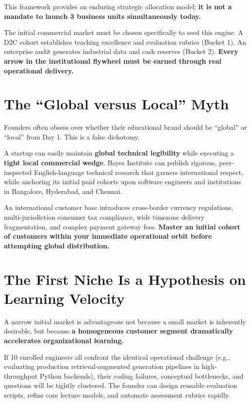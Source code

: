 This framework provides an enduring strategic allocation model; \textbf{it is not a mandate to launch 3 business units simultaneously today.}

The initial commercial market must be chosen specifically to seed this engine. A D2C cohort establishes teaching excellence and evaluation rubrics (Bucket 1). An enterprise audit generates industrial data and cash reserves (Bucket 2). \textbf{Every arrow in the institutional flywheel must be earned through real operational delivery.}

\section{The ``Global versus Local'' Myth}

Founders often obsess over whether their educational brand should be ``global'' or ``local'' from Day 1. This is a false dichotomy.

A startup can easily maintain \textbf{global technical legibility} while executing a \textbf{tight local commercial wedge}. Bayes Institute can publish rigorous, peer-inspected English-language technical research that garners international respect, while anchoring its initial paid cohorts upon software engineers and institutions in Bangalore, Hyderabad, and Chennai.

An international customer base introduces cross-border currency regulations, multi-jurisdiction consumer tax compliance, wide timezone delivery fragmentation, and complex payment gateway fees. \textbf{Master an initial cohort of customers within your immediate operational orbit before attempting global distribution.}

\section{The First Niche Is a Hypothesis on Learning Velocity}

A narrow initial market is advantageous not because a small market is inherently desirable, but because \textbf{a homogeneous customer segment dramatically accelerates organizational learning.}

If 10 enrolled engineers all confront the identical operational challenge (e.g., evaluating production retrieval-augmented generation pipelines in high-throughput Python backends), their coding failures, conceptual bottlenecks, and questions will be tightly clustered. The founder can design reusable evaluation scripts, refine core lecture models, and automate assessment rubrics rapidly.

